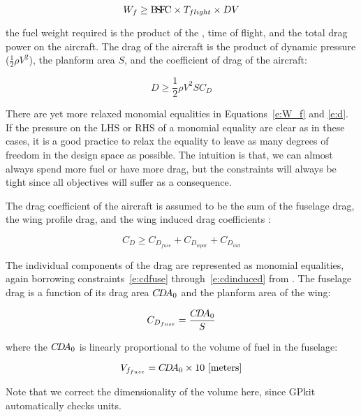 \begin{equation}
    W_f \geq {\rm B\!S\!F\!C} \times T_{flight} \times DV
    \label{e:W_f}
\end{equation}

the fuel weight required is the product of the \BSFC, time of flight, and the
total drag power on the aircraft.
The drag of the aircraft is the product of dynamic pressure ($\frac{1}{2} \rho V^2$),
the planform area $S$, and the coefficient of drag of the aircraft:

\begin{equation}
    D \geq \frac{1}{2} \rho V^2 S C_D
    \label{e:d}
\end{equation}

There are yet more relaxed monomial equalities in Equations~\ref{e:W_f} and \ref{e:d}.
If the pressure on the \gls{LHS} or \gls{RHS} of a monomial equality are clear as in these cases,
it is a good practice to relax the equality to leave as many degrees of freedom
in the design space as possible. The intuition is that, we can almost always spend more fuel or have more drag,
but the constraints will always be tight since all objectives will suffer as a consequence.

The drag coefficient of the aircraft is assumed to be the sum of the fuselage drag,
the wing profile drag, and the wing induced drag coefficients \cite{gp_ac_design}:

\begin{equation}
    C_D \geq C_{D_{fuse}} + C_{D_{wpar}} + C_{D_{ind}}
\label{e:cd}
\end{equation}

The individual components of the drag are represented as monomial equalities, again borrowing
constraints~\ref{e:cdfuse} through~\ref{e:cdinduced} from \cite{gp_ac_design}.
The fuselage drag is a function of its drag area $C\!D\!A_0$ and the planform area of the wing:

\begin{equation}
    C_{D_{fuse}} = \frac{C\!D\!A_0}{S}
\label{e:cdfuse}
\end{equation}

where the $C\!D\!A_0$ is linearly proportional to the volume of fuel in the fuselage:

\begin{equation}
    V_{f_{fuse}} = C\!D\!A_0 \times 10 ~\mathrm{[meters]}
\label{e:vffuse}
\end{equation}

Note that we correct the dimensionality of the volume here, since GPkit automatically checks units.

